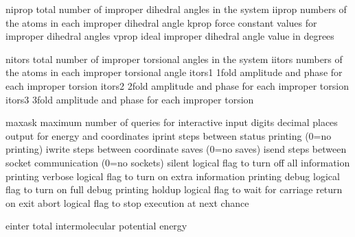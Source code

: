 \documentclass[letterpaper,11pt,english]{sphinxmanual}
\begin{document}

\begin{sphinxVerbatim}[commandchars=\\\{\}]
niprop          total number of improper dihedral angles in the system
iiprop          numbers of the atoms in each improper dihedral angle
kprop           force constant values for improper dihedral angles
vprop           ideal improper dihedral angle value in degrees
\end{sphinxVerbatim}


\begin{sphinxVerbatim}[commandchars=\\\{\}]
nitors          total number of improper torsional angles in the system
iitors          numbers of the atoms in each improper torsional angle
itors1          1\PYGZhy{}fold amplitude and phase for each improper torsion
itors2          2\PYGZhy{}fold amplitude and phase for each improper torsion
itors3          3\PYGZhy{}fold amplitude and phase for each improper torsion
\end{sphinxVerbatim}


\begin{sphinxVerbatim}[commandchars=\\\{\}]
maxask          maximum number of queries for interactive input
digits          decimal places output for energy and coordinates
iprint          steps between status printing (0=no printing)
iwrite          steps between coordinate saves (0=no saves)
isend           steps between socket communication (0=no sockets)
silent          logical flag to turn off all information printing
verbose         logical flag to turn on extra information printing
debug           logical flag to turn on full debug printing
holdup          logical flag to wait for carriage return on exit
abort           logical flag to stop execution at next chance
\end{sphinxVerbatim}


\begin{sphinxVerbatim}[commandchars=\\\{\}]
einter          total intermolecular potential energy
\end{sphinxVerbatim}
\end{document}
